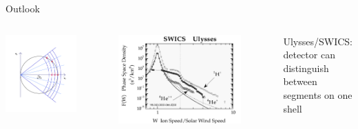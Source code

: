 \documentclass{beamer}
\begin{document}
\begin{frame}{Outlook}
	\begin{columns}
		\column{6cm}
		\flushleft
		\includegraphics[scale=0.9]{pictures/detektor3.pdf}
		\column{5cm}
		\begin{figure}
		\includegraphics[scale=0.18]{pictures/sw_pui_gloeckler.png}	
		\end{figure}
		\begin{columns}
		\column{3.5cm}
		Ulysses/SWICS: \\detector can distinguish between segments on one shell

\end{columns}
\end{columns}
\end{frame}
\end{document}
